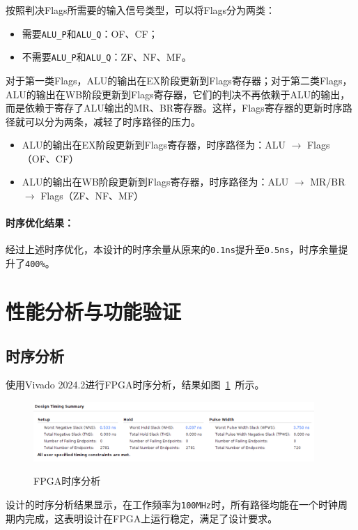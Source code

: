 \documentclass[lang=cn,a4paper,newtx]{elegantpaper}
\begin{document}
按照判决Flags所需要的输入信号类型，可以将Flags分为两类：
\begin{itemize}
  \item 需要\texttt{ALU\_P}和\texttt{ALU\_Q}：OF、CF；
  \item 不需要\texttt{ALU\_P}和\texttt{ALU\_Q}：ZF、NF、MF。
\end{itemize}

对于第一类Flags，ALU的输出在EX阶段更新到Flags寄存器；对于第二类Flags，ALU的输出在WB阶段更新到Flags寄存器，它们的判决不再依赖于ALU的输出，而是依赖于寄存了ALU输出的MR、BR寄存器。这样，Flags寄存器的更新时序路径就可以分为两条，减轻了时序路径的压力。
\begin{itemize}
  \item ALU的输出在EX阶段更新到Flags寄存器，时序路径为：ALU $\rightarrow$ Flags（OF、CF）
  \item ALU的输出在WB阶段更新到Flags寄存器，时序路径为：ALU $\rightarrow$ MR/BR $\rightarrow$ Flags（ZF、NF、MF）
\end{itemize}

\paragraph{时序优化结果：}
经过上述时序优化，本设计的时序余量从原来的\texttt{0.1ns}提升至\texttt{0.5ns}，时序余量提升了\texttt{400\%}。
\section{性能分析与功能验证}
\subsection{时序分析}
使用Vivado 2024.2进行FPGA时序分析，结果如图~\ref{fig:timing}~所示。
\begin{figure}[htbp]
  \centering
  \caption{FPGA时序分析}
  \includegraphics[width = 0.95\textwidth]{figure/timing_summary.png}
  \label{fig:timing}
\end{figure}

设计的时序分析结果显示，在工作频率为\texttt{100MHz}时，所有路径均能在一个时钟周期内完成，这表明设计在FPGA上运行稳定，满足了设计要求。
\end{document}
